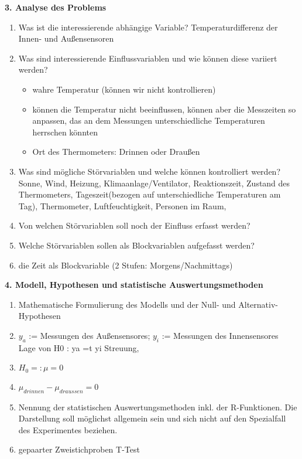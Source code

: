 \documentclass[ ngerman, fontsize= 12pt, paper=a4, headings=big, titlepage=true]{article}
\begin{document}
\textbf{3. Analyse des Problems}
\begin{enumerate}[-]
\item Was ist die interessierende abhängige Variable?
	 Temperaturdifferenz der Innen- und Außensensoren
\item Was sind interessierende Einflussvariablen und wie können diese variiert werden? \\
\begin{itemize}
	\item wahre Temperatur (können wir nicht kontrollieren)
	\item können die Temperatur nicht beeinflussen, können aber die Messzeiten so anpassen, das an dem Messungen unterschiedliche Temperaturen herrschen könnten
	
	\item Ort des Thermometers: Drinnen oder Draußen
\end{itemize}



\item Was sind mögliche Störvariablen und welche können kontrolliert werden?\\
Sonne, Wind, Heizung, Klimaanlage/Ventilator, Reaktionszeit, Zustand des Thermometers,  Tageszeit(bezogen auf unterschiedliche Temperaturen am Tag), Thermometer, Luftfeuchtigkeit, Personen im Raum,
\item Von welchen Störvariablen soll noch der Einfluss erfasst werden? \\
\item Welche Störvariablen sollen als Blockvariablen aufgefasst werden? \\

\item die Zeit als Blockvariable (2 Stufen: Morgens/Nachmittags)
\end{enumerate}

\textbf{4. Modell, Hypothesen und statistische Auswertungsmethoden}
\begin{enumerate}[-]
\item  Mathematische Formulierung des Modells und der Null- und Alternativ-Hypothesen \\

\item  $y_a$ := Messungen des Außensensores; $y_i$ := Messungen des Innensensores \\
Lage von H0 : ya =t yi Streuung,
\item $H_0=: \mu=0$ 

\item $\mu_{drinnen} - \mu_{draussen}=0$

\item Nennung der statistischen Auswertungsmethoden inkl. der R-Funktionen. Die Darstellung soll möglichst allgemein sein und sich nicht auf den Spezialfall des Experimentes beziehen. \\

\item  gepaarter Zweistichproben T-Test

\end{enumerate}
\end{document}
